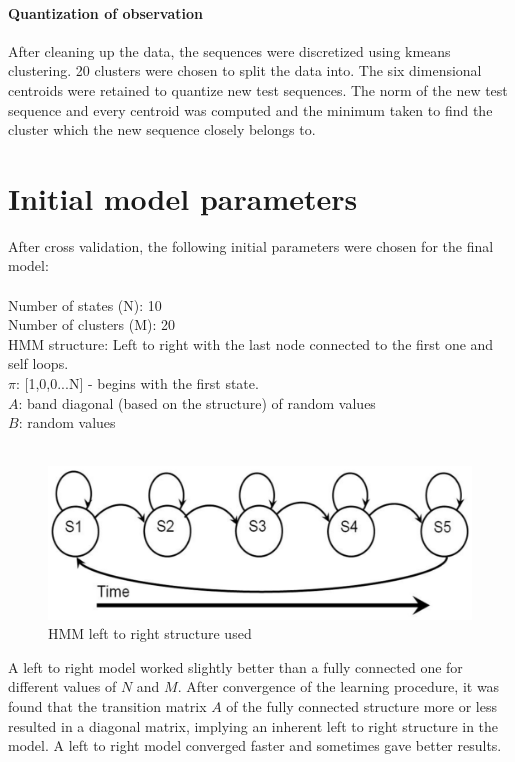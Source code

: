 \documentclass[english]{article}
\begin{document}
\paragraph{Quantization of observation}
After cleaning up the data, the sequences were discretized using kmeans clustering. 20 clusters were chosen to split the data into. The six dimensional centroids were retained to quantize new test sequences. The norm of the new test sequence and every centroid was computed and the minimum taken to find the cluster which the new sequence closely belongs to.

\section{Initial model parameters}
After cross validation, the following initial parameters were chosen for the final model:
\\\\ Number of states (N): 10
\\ Number of clusters (M): 20
\\ HMM structure: Left to right with the last node connected to the first one and self loops.
\\ $\pi$: [1,0,0...N] - begins with the first state.
\\ $A$: band diagonal (based on the structure) of random values
\\ $B$: random values
\\\\
\begin{figure}[h]
\centering
\includegraphics[scale = 2]{struct}
\caption{HMM left to right structure used}
\end{figure}

A left to right model worked slightly better than a fully connected one for different values of $N$ and $M$. After convergence of the learning procedure, it was found that the transition matrix $A$ of the fully connected structure more or less resulted in a diagonal matrix, implying an inherent left to right structure in the model. A left to right model converged faster and sometimes gave better results. 
\end{document}
